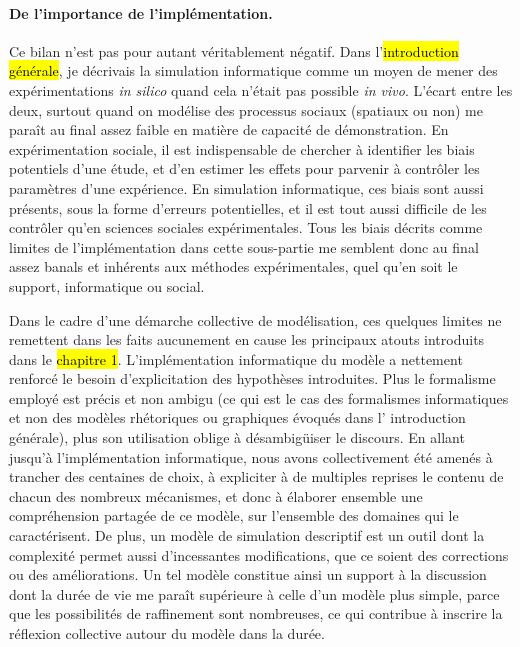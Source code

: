 \paragraph{De l'importance de l'implémentation.}
Ce bilan n'est pas pour autant véritablement négatif.
Dans l'\hl{introduction générale}, je décrivais la simulation informatique comme un moyen de mener des expérimentations \textit{in silico} quand cela n'était pas possible \textit{in vivo}.
L'écart entre les deux, surtout quand on modélise des processus sociaux (spatiaux ou non) me paraît au final assez faible en matière de capacité de démonstration.
En expérimentation sociale, il est indispensable de chercher à identifier les biais potentiels d'une étude, et d'en estimer les effets pour parvenir à contrôler les paramètres d'une expérience.
En simulation informatique, ces biais sont aussi présents, sous la forme d'erreurs potentielles, et il est tout aussi difficile de les contrôler qu'en sciences sociales expérimentales.
Tous les biais décrits comme \og limites de l'implémentation\fg{} dans cette sous-partie me semblent donc au final assez banals et inhérents aux méthodes expérimentales, quel qu'en soit le support, informatique ou social.

Dans le cadre d'une démarche collective de modélisation, ces quelques limites ne remettent dans les faits aucunement en cause les principaux atouts introduits dans le \hl{chapitre 1}.
L'implémentation informatique du modèle a nettement renforcé le besoin d'explicitation des hypothèses introduites.
Plus le formalisme employé est précis et non ambigu (ce qui est le cas des formalismes informatiques et non des modèles \og rhétoriques\fg{} ou \og graphiques\fg{} évoqués dans l' introduction générale), plus son utilisation oblige à désambigüiser le discours.
En allant jusqu'à l'implémentation informatique, nous avons collectivement été amenés à trancher des centaines de choix, à expliciter à de multiples reprises le contenu de chacun des nombreux mécanismes, et donc à élaborer ensemble une compréhension partagée de ce modèle, sur l'ensemble des domaines qui le caractérisent.
De plus, un modèle de simulation descriptif est un outil dont la complexité permet aussi d'incessantes modifications, que ce soient des corrections ou des améliorations.
Un tel modèle constitue ainsi un support à la discussion dont la \og durée de vie\fg{} me paraît supérieure à celle d'un modèle plus simple, parce que les possibilités de raffinement sont nombreuses, ce qui contribue à inscrire la réflexion collective autour du modèle dans la durée.

